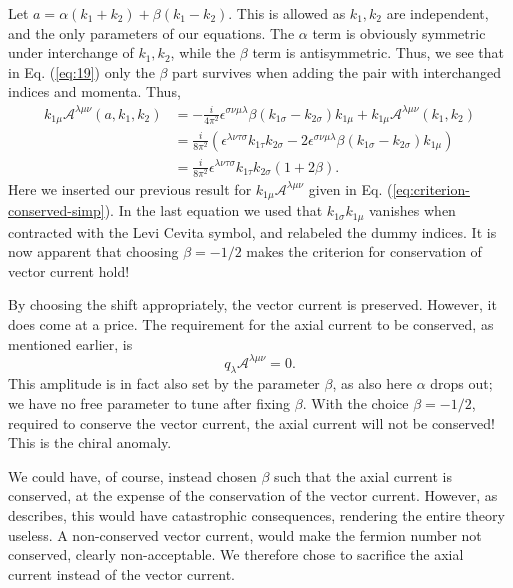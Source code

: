 Let $a=\alpha (k_1+k_2) + \beta (k_1-k_2)$.
This is allowed as $k_1, k_2$ are independent, and the only parameters of our equations.
The $\alpha$ term is obviously symmetric under interchange of $k_1, k_2$, while the $\beta$ term is antisymmetric.
Thus, we see that in Eq. (\ref{eq:19}) only the $\beta $ part survives when adding the pair with interchanged indices and momenta.
Thus,
\begin{align}
  k_{1\mu }\mathcal{A}^{\lambda \mu \nu }(a, k_1, k_2) &=
                                                         -\frac{i}{4\pi^2} \epsilon ^{\sigma \nu \mu \lambda } \beta (k_{1\sigma } - k_{2\sigma })k_{1\mu } + k_{1\mu }\mathcal{A}^{\lambda \mu \nu }(k_1, k_2)\\
                                                       &= \frac{i}{8\pi^2} \left(
                                                         \epsilon ^{\lambda \nu \tau \sigma }k_{1\tau }k_{2\sigma } - 2 \epsilon ^{\sigma \nu \mu \lambda } \beta (k_{1\sigma } - k_{2\sigma })k_{1\mu }\right)\\
  &= \frac{i}{8\pi^2} \epsilon ^{\lambda \nu \tau \sigma } k_{1\tau }k_{2\sigma } (1+ 2\beta ).
\end{align}
Here we inserted our previous result for $k_{1\mu }\mathcal{A}^{\lambda \mu \nu }$ given in Eq. (\ref{eq:criterion-conserved-simp}).
In the last equation we used that $k_{1\sigma }k_{1\mu }$ vanishes when contracted with the Levi Cevita symbol, and relabeled the dummy indices.
It is now  apparent that choosing $\beta = -1 / 2$ makes the criterion for conservation of vector current hold!

By choosing the shift appropriately, the vector current is preserved.
However, it does come at a price.
The requirement for the axial current to be conserved, as mentioned earlier, is
\[
  q_{\lambda } \mathcal{A}^{\lambda  \mu  \nu } = 0.
\]
This amplitude is in fact also set by the parameter $\beta $, as also here $\alpha $ drops out;
we have no free parameter  to tune after fixing $\beta $.
With the choice $\beta  = -1 / 2$, required to conserve the vector current, the axial current will not be conserved!
This is the chiral anomaly.

We could have, of course, instead chosen $\beta $ such that the axial current is conserved, at the expense of the conservation of the vector current.
However, as~\citeauthor{zeeQuantumFieldTheory2010}~\cite{zeeQuantumFieldTheory2010} describes, this would have catastrophic consequences, rendering the entire theory useless.
A non-conserved vector current, would make the fermion number not conserved, clearly non-acceptable.
We therefore chose to sacrifice the axial current instead of the vector current.


